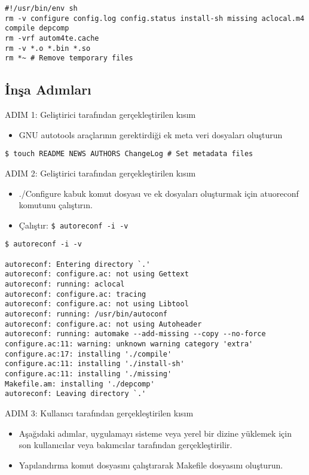 \documentclass[
]{book}
\providecommand{\tightlist}{%
  \setlength{\itemsep}{0pt}\setlength{\parskip}{0pt}}
\begin{document}
\begin{verbatim}
#!/usr/bin/env sh 
rm -v configure config.log config.status install-sh missing aclocal.m4 compile depcomp 
rm -vrf autom4te.cache
rm -v *.o *.bin *.so
rm *~ # Remove temporary files 
\end{verbatim}

\hypertarget{inux15fa-adux131mlarux131}{%
\subsection{İnşa Adımları}\label{inux15fa-adux131mlarux131}}

ADIM 1: Geliştirici tarafından gerçekleştirilen kısım

\begin{itemize}
\tightlist
\item
  GNU autotools araçlarının gerektirdiği ek meta veri dosyaları oluşturun
\end{itemize}

\texttt{\$\ touch\ README\ NEWS\ AUTHORS\ ChangeLog\ \#\ Set\ metadata\ files}

ADIM 2: Geliştirici tarafından gerçekleştirilen kısım

\begin{itemize}
\tightlist
\item
  ./Configure kabuk komut dosyası ve ek dosyaları oluşturmak için atuoreconf komutunu çalıştırın.
\item
  Çalıştır: \texttt{\$\ autoreconf\ -i\ -v}
\end{itemize}

\begin{verbatim}
$ autoreconf -i -v 

autoreconf: Entering directory `.'
autoreconf: configure.ac: not using Gettext
autoreconf: running: aclocal 
autoreconf: configure.ac: tracing
autoreconf: configure.ac: not using Libtool
autoreconf: running: /usr/bin/autoconf
autoreconf: configure.ac: not using Autoheader
autoreconf: running: automake --add-missing --copy --no-force
configure.ac:11: warning: unknown warning category 'extra'
configure.ac:17: installing './compile'
configure.ac:11: installing './install-sh'
configure.ac:11: installing './missing'
Makefile.am: installing './depcomp'
autoreconf: Leaving directory `.'
\end{verbatim}

ADIM 3: Kullanıcı tarafından gerçekleştirilen kısım

\begin{itemize}
\tightlist
\item
  Aşağıdaki adımlar, uygulamayı sisteme veya yerel bir dizine yüklemek için son kullanıcılar veya bakımcılar tarafından gerçekleştirilir.
\item
  Yapılandırma komut dosyasını çalıştırarak Makefile dosyasını oluşturun.
\end{itemize}
\end{document}
